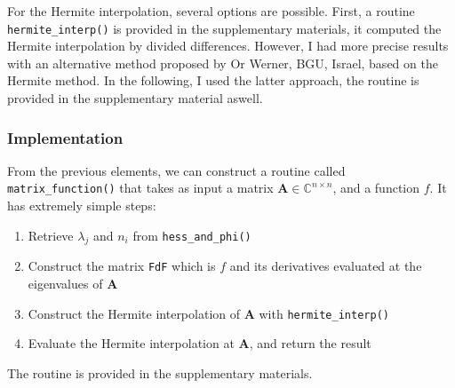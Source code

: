 \documentclass[11pt]{article}
\numberwithin{equation}{section}
\begin{document}
For the Hermite interpolation, several options are possible. First, a routine \texttt{hermite\_interp()} is provided in the supplementary materials, it computed the Hermite interpolation by divided differences. However, I had more precise results with an alternative method proposed by Or Werner, BGU, Israel, based on the Hermite method. In the following, I used the latter approach, the routine is provided in the supplementary material aswell.
\subsubsection{Implementation}
From the previous elements, we can construct a routine called \texttt{matrix\_function()} that takes as input a matrix $\mathbf{A}\in\mathbb{C}^{n\times n}$, and a function $f$. It has extremely simple steps:
\begin{enumerate}
    \item Retrieve $\lambda_j$ and $n_i$ from \texttt{hess\_and\_phi()}
    \item Construct the matrix \texttt{FdF} which is $f$ and its derivatives evaluated at the eigenvalues of $\mathbf{A}$
    \item Construct the Hermite interpolation of $\mathbf{A}$ with \texttt{hermite\_interp()}
    \item Evaluate the Hermite interpolation at $\mathbf{A}$, and return the result
\end{enumerate}
The routine is provided in the supplementary materials.
\end{document}
